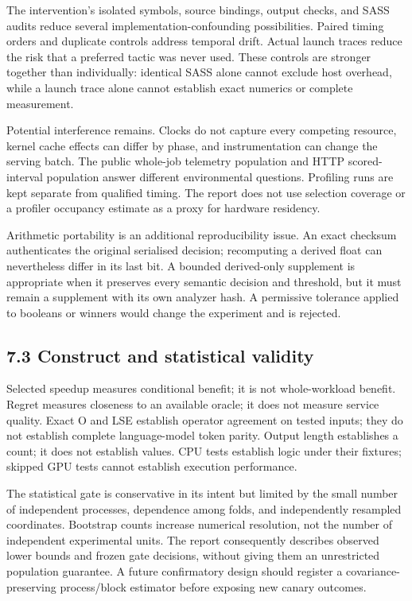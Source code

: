 \documentclass[11pt,a4paper]{article}
\begin{document}
The intervention's isolated symbols, source bindings, output checks, and SASS audits reduce several implementation-confounding possibilities. Paired timing orders and duplicate controls address temporal drift. Actual launch traces reduce the risk that a preferred tactic was never used. These controls are stronger together than individually: identical SASS alone cannot exclude host overhead, while a launch trace alone cannot establish exact numerics or complete measurement.


Potential interference remains. Clocks do not capture every competing resource, kernel cache effects can differ by phase, and instrumentation can change the serving batch. The public whole-job telemetry population and HTTP scored-interval population answer different environmental questions. Profiling runs are kept separate from qualified timing. The report does not use selection coverage or a profiler occupancy estimate as a proxy for hardware residency.


Arithmetic portability is an additional reproducibility issue. An exact checksum authenticates the original serialised decision; recomputing a derived float can nevertheless differ in its last bit. A bounded derived-only supplement is appropriate when it preserves every semantic decision and threshold, but it must remain a supplement with its own analyzer hash. A permissive tolerance applied to booleans or winners would change the experiment and is rejected.


\subsection*{7.3 Construct and statistical validity}

Selected speedup measures conditional benefit; it is not whole-workload benefit. Regret measures closeness to an available oracle; it does not measure service quality. Exact O and LSE establish operator agreement on tested inputs; they do not establish complete language-model token parity. Output length establishes a count; it does not establish values. CPU tests establish logic under their fixtures; skipped GPU tests cannot establish execution performance.


The statistical gate is conservative in its intent but limited by the small number of independent processes, dependence among folds, and independently resampled coordinates. Bootstrap counts increase numerical resolution, not the number of independent experimental units. The report consequently describes observed lower bounds and frozen gate decisions, without giving them an unrestricted population guarantee. A future confirmatory design should register a covariance-preserving process/\allowbreak{}block estimator before exposing new canary outcomes.
\end{document}
